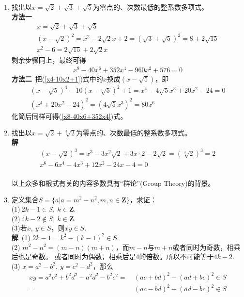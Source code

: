 \begin{enumerate}[label={【\textbf{例\thechapter.\arabic*}】},
 leftmargin=\inteval{\myenumleftmargin}pt,
 itemsep=\inteval{\myenumitempsep}pt,
 itemindent=\inteval{\myenumitemindent}pt]
\item 找出以$ x=\sqrt{2}+\sqrt{3}+\sqrt{5} $为零点的、次数最低的整系数多项式。\\
\textbf{方法一}\ 
\begin{gather*}
    x= \sqrt{2}+\sqrt{3}+\sqrt{5} \\
    (x-\sqrt{2})^2=x^2-2\sqrt{2}x+2= (\sqrt{3}+\sqrt{5})^2= 8+2\sqrt{15} \\
    x^2-6=2\sqrt{15}+2\sqrt{2}x
\end{gather*}
剩余步骤同上，最终可得
\begin{align}\label{x8-40x6+352x4}
    x^8-40x^6+352x^4-960x^2+576=0
\end{align}
\textbf{方法二}\ 把(\ref{x4-10x2+1})式中的$ x $换成$ (x-\sqrt{5}) $，即
\begin{gather*}
    (x-\sqrt{5})^4-10(x-\sqrt{5})^2+1=x^4-4\sqrt{5}x^3+20x^2-24=0\\
    (x^4+20x^2-24)^2=(4\sqrt{5}x^3)^2=80x^6
\end{gather*}
化简后同样可得(\ref{x8-40x6+352x4})式。

\item 找出以$ x=\sqrt{2}+\sqrt[3]{2} $为零点的、次数最低的整系数多项式。\\
\textbf{解}\ 
\begin{gather*}
    (x-\sqrt{2})^3=x^3-3x^2\sqrt{2}+3x\cdot 2-2\sqrt{2}=(\sqrt[3]{2})^3=2 \\
    x^6-6x^4-4x^3+12x^2-24x-4=0
\end{gather*}
\\
以上众多和根式有关的内容多数具有“群论”(Group Theory)的背景。

\item 定义集合$ S=\{a|a=m^2-n^2,m,n\in \textbf{Z}\} $，求证：\\
(1)$ \ 2k-1\in S,\ k\in \textbf{Z} $. \\
(2)$ \ 4k-2\notin S,\ k\in \textbf{Z} $. \\
(3)若$ x,\ y\in S $，则$ xy \in　S $. \\
\textbf{解}\ (1) $ 2k-1=k^2-(k-1)^2 \in S $. \\
(2) $ m^2-n^2=(m-n)(m+n) $，而$ m-n $与$ m+n $或者同时为奇数，相乘后也是奇数。
或者同时为偶数，相乘后是4的倍数。所以不可能等于$ 4k-2 $. \\
(3) $ x=a^2-b^2,\ y=c^2-d^2 $，那么
\begin{align*}
    xy=a^2c^2+b^2d^2-a^2d^2-b^2c^2=&\  (ac+bd)^2-(ad+bc)^2 \in S \\
    =&\  (ac-bd)^2-(ad-bc)^2 \in S
\end{align*}


\end{enumerate}
